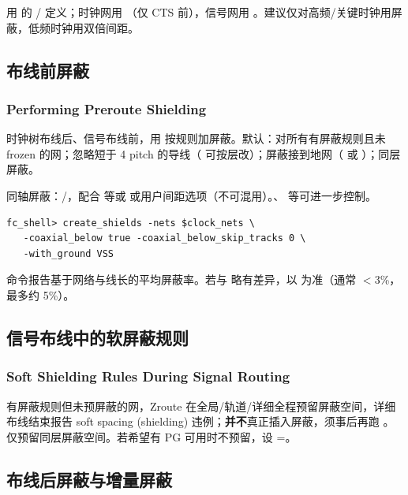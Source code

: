 用  的 / 定义；时钟网用 （仅 CTS 前），信号网用 。建议仅对高频/关键时钟用屏蔽，低频时钟用双倍间距。

\subsection{布线前屏蔽}
\subsubsection*{Performing Preroute Shielding}

时钟树布线后、信号布线前，用  按规则加屏蔽。默认：对所有有屏蔽规则且未 frozen 的网；忽略短于 4 pitch 的导线（ 可按层改）；屏蔽接到地网（ 或 ）；同层屏蔽。

同轴屏蔽：/，配合  等或  或用户间距选项（不可混用）。、 等可进一步控制。

\begin{lstlisting}
fc_shell> create_shields -nets $clock_nets \
   -coaxial_below true -coaxial_below_skip_tracks 0 \
   -with_ground VSS
\end{lstlisting}

命令报告基于网络与线长的平均屏蔽率。若与  略有差异，以  为准（通常 $<$3\%，最多约 5\%）。

\subsection{信号布线中的软屏蔽规则}
\subsubsection*{Soft Shielding Rules During Signal Routing}

有屏蔽规则但未预屏蔽的网，Zroute 在全局/轨道/详细全程预留屏蔽空间，详细布线结束报告 soft spacing (shielding) 违例；\textbf{并不}真正插入屏蔽，须事后再跑 。仅预留同层屏蔽空间。若希望有 PG 可用时不预留，设 =。

\subsection{布线后屏蔽与增量屏蔽}
